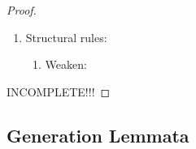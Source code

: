 \begin{theorem}
{\begin{proof}
\begin{enumerate}
            \item Structural rules:
            \begin{enumerate}
                \item Weaken:
            \end{enumerate}
        \end{enumerate}

        INCOMPLETE!!!
    \end{proof}
    }
\end{theorem}





\subsection{Generation Lemmata}



